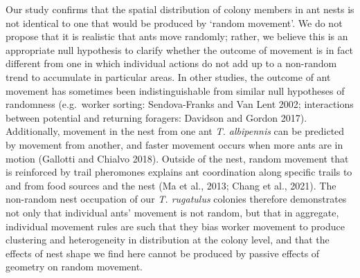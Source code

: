 \documentclass[3p]{elsarticle} %
\begin{document}
Our study confirms that the spatial distribution of colony members in
ant nests is not identical to one that would be produced by `random
movement'. We do not propose that it is realistic that ants move
randomly; rather, we believe this is an appropriate null hypothesis to
clarify whether the outcome of movement is in fact different from one in
which individual actions do not add up to a non-random trend to
accumulate in particular areas. In other studies, the outcome of ant
movement has sometimes been indistinguishable from similar null
hypotheses of randomness (e.g.~worker sorting: Sendova-Franks and Van
Lent 2002; interactions between potential and returning foragers:
Davidson and Gordon 2017). Additionally, movement in the nest from one
ant \emph{T. albipennis} can be predicted by movement from another, and
faster movement occurs when more ants are in motion (Gallotti and
Chialvo 2018). Outside of the nest, random movement that is reinforced
by trail pheromones explains ant coordination along specific trails to
and from food sources and the nest (Ma et al., 2013; Chang et al.,
2021). The non-random nest occupation of our \emph{T. rugatulus}
colonies therefore demonstrates not only that individual ants' movement
is not random, but that in aggregate, individual movement rules are such
that they bias worker movement to produce clustering and heterogeneity
in distribution at the colony level, and that the effects of nest shape
we find here cannot be produced by passive effects of geometry on random
movement.
\end{document}
